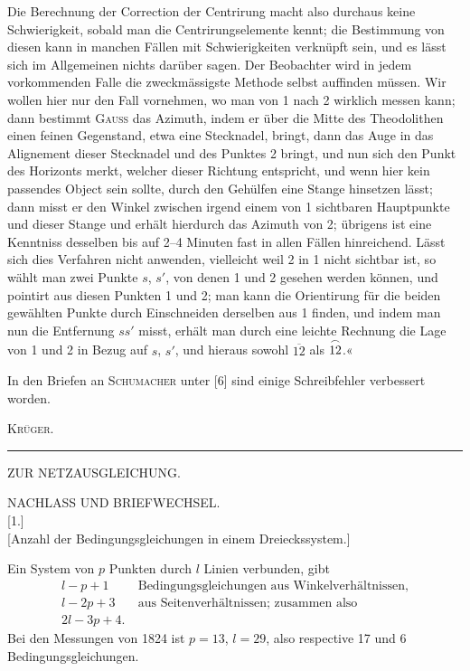 Die Berechnung der Correction der Centrirung macht also durchaus keine Schwierigkeit, sobald man die Centrirungselemente kennt; die Bestimmung von diesen kann in manchen Fällen mit Schwierigkeiten verknüpft sein, und es lässt sich im Allgemeinen nichts darüber sagen. Der Beobachter wird in jedem vorkommenden Falle die zweckmässigste Methode selbst auffinden müssen. Wir wollen hier nur den Fall vornehmen, wo man von 1 nach 2 wirklich messen kann; dann bestimmt \textsc{Gauss} das Azimuth, indem er über die Mitte des Theodolithen einen feinen Gegenstand, etwa eine Stecknadel, bringt, dann das Auge in das Alignement dieser Stecknadel und des Punktes 2 bringt, und nun sich den Punkt des Horizonts merkt, welcher dieser Richtung entspricht, und wenn hier kein passendes Object sein sollte, durch den Gehülfen eine Stange hinsetzen lässt; dann misst er den Winkel zwischen irgend einem von 1 sichtbaren Hauptpunkte und dieser Stange und erhält hierdurch das Azimuth von 2; übrigens ist eine Kenntniss desselben bis auf 2--4 Minuten fast in allen Fällen hinreichend. Lässt sich dies Verfahren nicht anwenden, vielleicht weil 2 in 1 nicht sichtbar ist, so wählt man zwei Punkte $s$, $s'$, von denen 1 und 2 gesehen werden können, und pointirt aus diesen Punkten 1 und 2; man kann die Orientirung für die beiden gewählten Punkte durch Einschneiden derselben aus 1 finden, und indem man nun die Entfernung $ss'$ misst, erhält man durch eine leichte Rechnung die Lage von 1 und 2 in Bezug auf $s$, $s'$, und hieraus sowohl $\overline{12}$ als $\overset{\frown}{12}$.«

\medskip
In den Briefen an \textsc{Schumacher} unter [6] sind einige Schreibfehler verbessert worden.

\hfill\textsc{Krüger.}
\vfill
\begin{center}\rule{4cm}{.4pt}\end{center}

\clearpage\null
\clearpage
\vspace*{\fill}
\begin{center}{\LARGE ZUR NETZAUSGLEICHUNG.}\end{center}
\vfill
\clearpage\null
\clearpage
\begin{center}
{\Large NACHLASS UND BRIEFWECHSEL.}\\[2cm]
[1.]\\[3pt]
[Anzahl der Bedingungsgleichungen in einem Dreieckssystem.]
\end{center}
Ein System von $p$ Punkten durch $l$ Linien verbunden, gibt
\[
\begin{aligned}
l-p+1\quad&\text{Bedingungsgleichungen aus Winkelverhältnissen,}\\
l-2p+3\quad&\text{aus Seitenverhältnissen; zusammen also}\\
2l-3p+4.&
\end{aligned}
\]
\noindent{}\indent Bei den Messungen von 1824 ist $p=13$, $l=29$, also respective 17 und 6 Bedingungsgleichungen.

